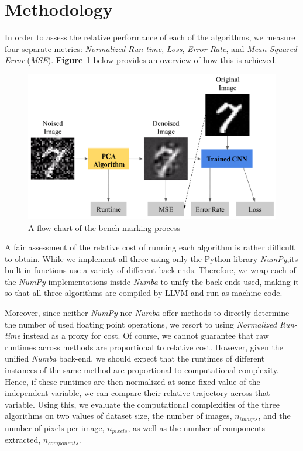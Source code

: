 \documentclass[12pt]{article}
\begin{document}
\pagebreak
\section{Methodology} \label{4}

    In order to assess the relative performance of each of the algorithms, we measure four separate metrics: \textit{Normalized Run-time}, \textit{Loss},  \textit{Error Rate}, and \textit{Mean Squared Error} (\textit{MSE}). \textbf{\hyperref[methodology]{Figure \ref*{methodology}}} below provides an overview of how this is achieved.
    
    \begin{figure}[H]
    \begin{center}
    \includegraphics[width=\textwidth]{Methodology.png}
    \caption{A flow chart of the bench-marking process}
    \label{methodology}
    \end{center}
    \end{figure}
    
    A fair assessment of the relative cost of running each algorithm is rather difficult to obtain. While we implement all three using only the Python library \textit{NumPy},its built-in functions use a variety of different back-ends. Therefore, we wrap each of the \textit{NumPy} implementations inside \textit{Numba} to unify the back-ends used, making it so that all three algorithms are compiled by LLVM and run as machine code. 
    
    Moreover, since neither \textit{NumPy} nor \textit{Numba} offer methods to directly determine the number of used floating point operations, we resort to using \textit{Normalized Run-time} instead as a proxy for cost. Of course, we cannot guarantee that raw runtimes across methods are proportional to relative cost. However, given the unified \textit{Numba} back-end, we should expect that the runtimes of different instances of the same method are proportional to computational complexity. Hence, if these runtimes are then normalized at some fixed value of the independent variable, we can compare their relative trajectory across that variable. Using this, we evaluate the computational complexities of the three algorithms on two values of dataset size, the number of images, $n_{images}$, and the number of pixels per image, $n_{pixels}$, as well as the number of components extracted, $n_{components}$.
    
\end{document}
